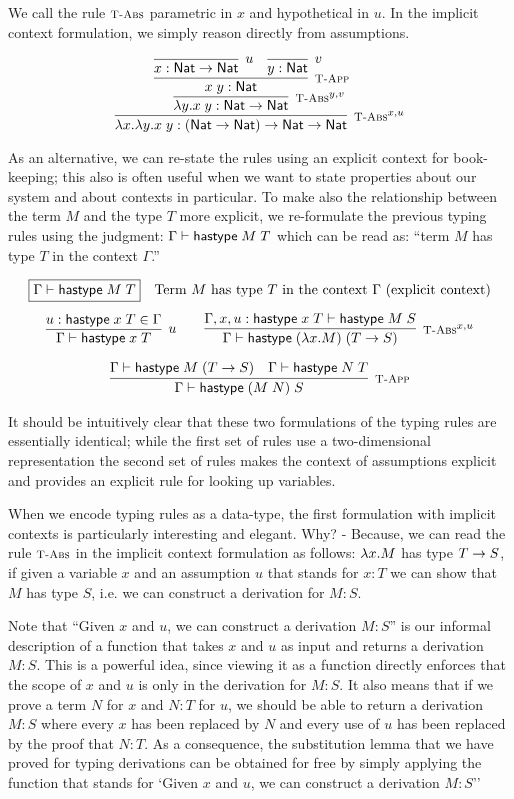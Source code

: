 We call the rule $\textsc{\footnotesize T-Abs}$ parametric in $x$ and hypothetical in $u$.
In the implicit context formulation, we simply reason directly from
assumptions.


\[
\infer[\TFn^{x,u}]{\lam x. \lam y. x \app y : (\Nat \arrow \Nat) \arrow \Nat \arrow \Nat}
{\infer[\TFn^{y,v}]{\lam y.x \app y : \Nat \arrow \Nat}{
 \infer[\TApp]{x \app y : \Nat}
   {\infer[u]{x:\Nat \arrow \Nat}{} &
    \infer[v]{y:\Nat}{}
   }
 }
}
\]

As an alternative, we can re-state the rules using an explicit context for
book-keeping; this also is often useful when we want to state properties about
our system and about contexts in particular. To make also the
relationship between the term $M$ and the type $T$ more explicit, we
re-formulate the previous typing rules using the judgment: $\Gamma
\vdash \mathsf{hastype}\;M\;T$ which can be read as: ``term $M$ has type $T$
in the context $\Gamma$.''

\[
\begin{array}{c}
\multicolumn{1}{l}{\fbox{$\Gamma \vdash \tmhastype M
    T$}\quad\mbox{Term $M$ has type $T$ in the context $\Gamma$
    (explicit context)} }
\\[1em]
\infer[u]{\Gamma \vdash \tmhastype x T}{u:\tmhastype x T \in \Gamma} \qquad
\infer[\TFn^{x,u}]{\Gamma \vdash \tmhastype {(\lam x.M)} {(T \arrow S)}}
                 {\Gamma,x, u:\tmhastype x T \vdash \tmhastype M S}
\\[1em]
\infer[\TApp]{\Gamma \vdash \tmhastype {(M \app N)} S}
             {\Gamma \vdash \tmhastype M (T \arrow S)
  & \Gamma \vdash \tmhastype N T}
\end{array}
\]

It should be intuitively clear that these two formulations of the typing rules
are essentially identical; while the first set of rules use a two-dimensional
representation the second set of rules makes the context of
assumptions explicit and provides an explicit rule for looking up variables.

When we encode typing rules as a data-type, the first formulation with implicit
contexts is particularly interesting and elegant. Why? - Because, we can read the
rule $\textsc{\footnotesize T-Abs}$ in the implicit context formulation as follows: $\lambda x.M$ has type $T \rightarrow S$, if given a variable
$x$ and an assumption $u$ that stands for $x:T$ we can show that $M$ has type
$S$, i.e. we can construct a derivation for $M:S$.

Note that ``Given $x$ and $u$, we can construct a derivation $M:S$'' is our
informal description of a function that takes $x$ and $u$ as input and returns a
derivation $M:S$. This is a powerful idea, since viewing it as a function
directly enforces that the scope of $x$ and $u$ is only in the derivation for
$M:S$. It also means that if we prove a term $N$ for $x$ and $N:T$ for $u$, we
should be able to return a derivation $M:S$ where every $x$ has been replaced
by $N$ and every use of $u$ has been replaced by the proof that $N:T$. As a
consequence, the substitution lemma that we have proved for typing derivations
can be obtained for free by simply applying the function that stands for `Given
$x$ and $u$, we can construct a derivation $M:S$''


